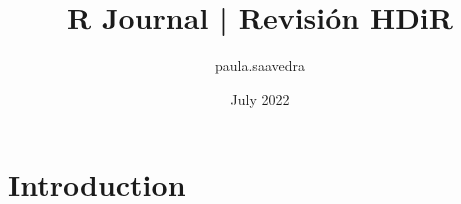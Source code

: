 \documentclass{article}
\title{R Journal | Revisión HDiR}
\author{paula.saavedra }
\date{July 2022}
\begin{document}
\maketitle

\section{Introduction}
\end{document}
